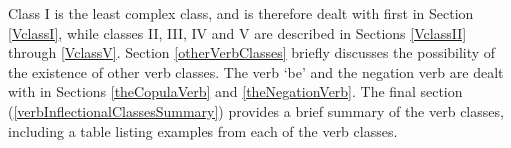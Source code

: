 Class I is the least complex class, %
and is therefore dealt with first in Section \ref{VclassI}, %
while classes II, III, IV and V are described in Sections \ref{VclassII} %
through \ref{VclassV}. %
Section \ref{otherVerbClasses} briefly discusses the possibility of the existence of other verb classes. The verb  ‘be’ and the negation verb are dealt with in Sections \ref{theCopulaVerb} and \ref{theNegationVerb}. The final section (\ref{verbInflectionalClassesSummary}) provides a brief summary of the verb classes, including a table listing examples from each of the verb classes. 


